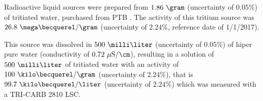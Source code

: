 Radioactive liquid sources were prepared from $1.86~\gram$ (uncertainty of $0.05\%$) of tritiated water, purchased from PTB \cite{PTB}. The activity of this tritium source was $26.8~\mega\becquerel/\gram$ (uncertainty of $2.24\%$, reference date of 1/1/2017).

This source was dissolved in $500~\milli\liter$ (uncertainty of $0.05\%$) of hiper pure water (conductivity of $0.72~\mu\text{S}/\cm$), resulting in a solution of $500~\milli\liter$ of tritiated water with an activity of $100~\kilo\becquerel/\gram$ (uncertainty of $2.24\%$), that is $99.7~\kilo\becquerel/\liter$ (uncertainty of $2.24\%$) which was measured with a TRI-CARB 2810 LSC.


